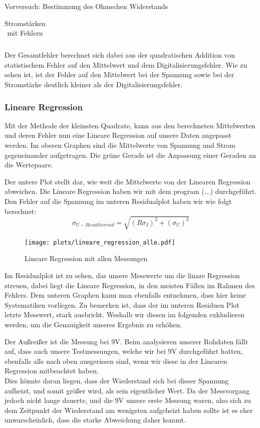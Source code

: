 \documentclass[twoside]{protokoll}
\begin{document}
\begin{aufgabe}{Vorversuch: Bestimmung des Ohmschen Widerstands}
\begin{table}[H]
\begin{tabularx}{1\textwidth}{X X X X}
        \bottomrule
    \end{tabularx}
    \caption{Stromstärken mit Fehlern}
    \label{tab:Tabelle 4}
\end{table}
Der Gesamtfehler berechnet sich dabei aus der quadratischen Addition von statistischem Fehler auf den Mittelwert und dem Digitalisierungsfehler.
Wie zu sehen ist, ist der Fehler auf den Mittelwert bei der Spannung sowie bei der Stromstärke deutlich kleiner als der Digitalisierungsfehler.\\

\subsubsection{Lineare Regression}

Mit der Methode der kleinsten Quadrate, kann aus den berechneten Mittelwerten und deren Fehler nun eine Lineare Regression auf unsere Daten angepasst werden.
Im oberen Graphen sind die Mittelwerte von Spannung und Strom gegeneinander aufgetragen.
Die grüne Gerade ist die Anpassung einer Geraden an die Wertepaare.
 
Der untere Plot stellt dar, wie weit die Mittelwerte von der Linearen Regression abweichen.  
Die Lineare Regression haben wir mit dem program (...) durchgeführt.\\

Den Fehler auf die Spannung im unteren Residualplot haben wir wie folgt berechnet:
\begin{equation}
    \sigma_{U-Resultierend} = \sqrt{(R \sigma_I)^2 + (\sigma_U)^2}
\end{equation}

 \begin{figure}[H]
  \centering
  \texttt{[image: plots/lineare\_regression\_alle.pdf]}
  \caption{Lineare Regression mit allen Messungen}
  \centering
  \end{figure}


Im Residualplot ist zu sehen, das unsere Messwerte um die linare Regression streuen, dabei liegt die Lineare Regression, in den meisten Fällen im Rahmen des Fehlers.
Dem unteren Graphen kann man ebenfalls entnehmen, dass hier keine Systematiken vorliegen. 
Zu bemerken ist, dass der im unteren Residuen Plot letzte Messwert, stark ausbricht. Weshalb wir diesen im folgenden exkludieren werden, um die Genauigkeit unseres Ergebnis zu erhöhen.

Der Außreißer ist die Messung bei 9V. Beim analysieren unserer Rohdaten fällt auf, dass auch unsere Testmessungen, welche wir bei 9V durchgeführt hatten, ebenfalls alle  nach oben ausgerissen sind, wenn wir diese in der Linearen Regression mitbeachtet haben.\\
Dies könnte daran liegen, dass der Wiederstand sich bei dieser Spannung aufheizt, und somit größer wird, als sein eigentlicher Wert. 
Da der Messvorgang jedoch nicht lange dauerte, und die 9V unsere erste Messung waren, also sich zu dem Zeitpunkt der Wiederstand am wenigsten aufgeheizt haben sollte ist es eher unwarscheinlich, dass die starke Abweichung daher kommt. \\


\end{aufgabe}
\end{document}
